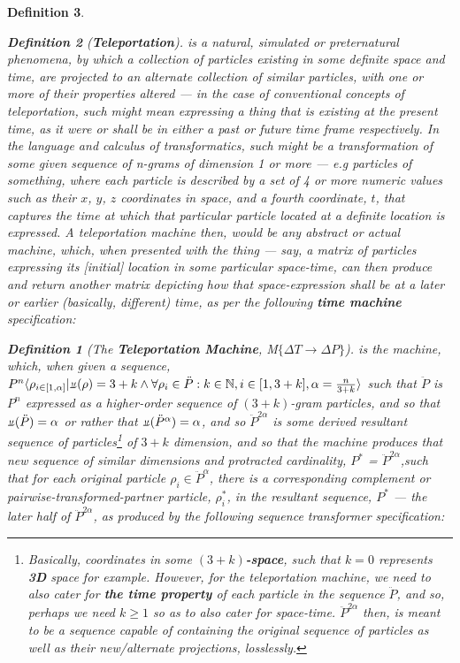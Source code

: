 \documentclass[a4paper, 18pt]{book} %
\newtheorem{defn}{Definition}
\newcommand{\invpi}{\rotatebox[origin=c]{180}{$\pi$}}
\begin{document}
\begin{appendices}
\begin{defn}
\begin{defn}[\textbf{Teleportation}]
\label{DEFTELEPORTATION}
 is a natural, simulated or preternatural phenomena, by which a collection of particles existing in some definite space and time, are projected to an alternate collection of similar particles, with one or more of their properties altered --- in the case of conventional concepts of teleportation, such might mean expressing \textit{a thing} that is existing at the present time, as it were or shall be in either a past or future time frame respectively. In the language and calculus of transformatics, such might be a transformation of some given sequence of \textit{n}-grams of dimension 1 or more --- e.g particles of something, where each particle is described by a set of 4 or more numeric values such as their $x$, $y$, $z$ coordinates in space, and a fourth coordinate, $t$, that captures the time at which that particular particle located at a definite location is expressed. A teleportation machine then, would be any abstract or \textit{actual} machine, which, when presented with \textit{the thing} --- say, a matrix of particles expressing its [initial] location in some particular space-time, can then produce and return another matrix depicting how that space-expression shall be at a later or earlier (basically, different) time, as per the following \textbf{time machine} specification:

\begin{defn}[The \textbf{Teleportation Machine}, M$\{\Delta T \rightarrow \Delta P\}$] 
is the machine, which, when given a sequence, $P^n\langle \rho_{i \in [1,\alpha]} | \invpi(\rho) = 3+k \land \forall \rho_i \in \ddot{P} : k \in \mathbb{N}, i \in [1,3+k], \alpha = \frac{n}{3+k} \rangle$ such that $\ddot{P}$ is $P^n$ expressed as a higher-order sequence of $(3+k)$-gram particles, and so that $\invpi(\ddot{P})=\alpha$ or rather that $\invpi(\ddot{P}^\alpha)=\alpha$, and so $\ddot{P}^{2\alpha}$ is some derived resultant sequence of particles\footnote{Basically, coordinates in some \textbf{$(3+k)$-space}, such that $k = 0$ represents \textbf{3D} space for example. However, for the teleportation machine, we need to also cater for \textbf{the time property} of each particle in the sequence $\ddot{P}$, and so, perhaps we need $k \geq 1$ so as to also cater for space-time. $\ddot{P}^{2\alpha}$ then, is meant to be a sequence capable of containing the original sequence of particles as well as their new/alternate projections, losslessly.} of $3+k$ dimension, and so that the machine produces that new sequence of similar dimensions and protracted cardinality, $P^*$ = $\ddot{P}^{2\alpha}$,such that for each original particle $\rho_i \in \ddot{P}^{\alpha}$, there is a corresponding complement or pairwise-transformed-partner particle, $\rho^*_i$, in the resultant sequence, $P^*$ --- the later half of $\ddot{P}^{2\alpha}$, as produced by the following sequence transformer specification:\\


\end{defn}
\end{defn}
\end{defn}
\end{appendices}
\end{document}
